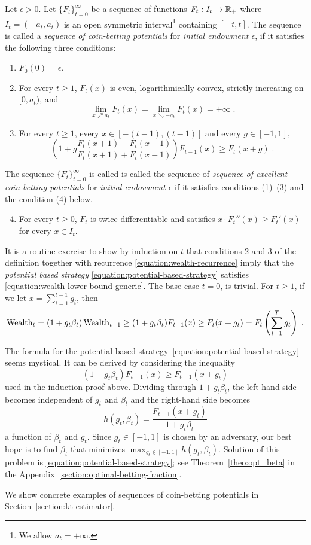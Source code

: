 \begin{definition}
\label{definition:potential}
Let $\epsilon > 0$. Let $\{F_t\}_{t=0}^\infty$ be a sequence of functions
$F_t:I_t  \to \mathbb{R}_+$ where $I_t = (-a_t, a_t)$ is an open symmetric
interval\footnote{We allow $a_t = +\infty$.} containing $[-t,t]$.  The sequence
is called a \emph{sequence of coin-betting potentials} for \emph{initial
endowment $\epsilon$}, if it satisfies the following three conditions:
\begin{enumerate}[(1)]
\item $F_0(0) = \epsilon$.

\item For every $t \ge 1$, $F_t(x)$ is even, logarithmically convex, strictly
increasing on $[0,a_t)$, and
\begin{equation}
\label{equation:potential-limit-assumption}
\lim_{x \nearrow a_t} F_t(x) = \lim_{x \searrow -a_t} F_t(x) = +\infty \; .
\end{equation}

\item For every $t \ge 1$, every $x \in [-(t-1), (t-1)]$ and every $g \in [-1,1]$,
$$
\left(1 + g \frac{F_t(x + 1) - F_t(x - 1)}{F_t(x + 1) + F_t(x - 1)} \right) F_{t-1}(x) \ge F_t(x+g) \; .
$$
\end{enumerate}
The sequence $\{F_t\}_{t=0}^\infty$  is called is called the sequence of
\emph{sequence of excellent coin-betting potentials} for \emph{initial
endowment $\epsilon$} if it satisfies conditions (1)--(3) and the condition (4)
below.
\begin{enumerate}[(1)]
\setcounter{enumi}{3}
\item For every $t \ge 0$, $F_t$ is twice-differentiable and
satisfies $x \cdot F_t''(x) \ge F_t'(x)$ for every $x \in I_t$.
\end{enumerate}
\end{definition}

It is a routine exercise to show by induction on $t$ that conditions 2 and 3
of the definition together with recurrence \eqref{equation:wealth-recurrence}
imply that the \emph{potential based strategy}
\eqref{equation:potential-based-strategy} satisfies
\eqref{equation:wealth-lower-bound-generic}. The base case $t=0$, is trivial.
For $t \ge 1$, if we let $x = \sum_{i=1}^{t-1} g_i$, then
$$
\operatorname{Wealth}_t
= (1+g_t \beta_t) \operatorname{Wealth}_{t-1}
\ge (1 + g_t \beta_t) F_{t-1}(x)
\ge F_t(x + g_t)
= F_t \left( \sum_{t=1}^T g_t \right) \; .
$$

The formula for the potential-based
strategy~\eqref{equation:potential-based-strategy} seems mystical. It
can be derived by considering the inequality
$$
(1+g_t\beta_t) F_{t-1}(x) \ge F_{t-1}(x + g_t)
$$
used in the induction proof above. Dividing through $1+g_t\beta_t$, the left-hand
side becomes independent of $g_t$ and $\beta_t$ and the right-hand side becomes
$$
h(g_t, \beta_t) = \frac{F_{t-1}(x + g_t)}{1 + g_t\beta_t}
$$
a function of $\beta_t$ and $g_t$. Since $g_t \in [-1,1]$ is chosen by an
adversary, our best hope is to find $\beta_t$ that minimizes $\max_{g_t \in
[-1,1]} h(g_t,\beta_t)$. Solution of this problem is
\eqref{equation:potential-based-strategy}; see Theorem~\ref{theo:opt_beta} in
the Appendix~\ref{section:optimal-betting-fraction}.

We show concrete examples of sequences of coin-betting potentials in
Section~\ref{section:kt-estimator}.
